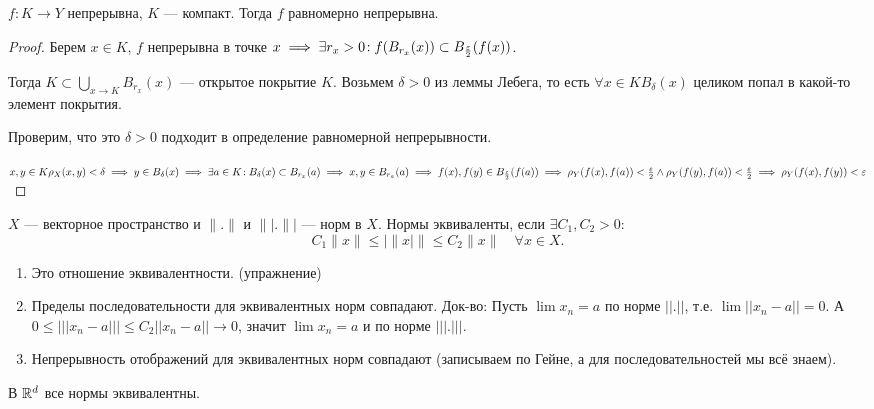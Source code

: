 \begin{theorem}
    $f\!: K \to Y$ непрерывна,  $K$ --- компакт. Тогда  $f$ равномерно непрерывна. 
\end{theorem}
\begin{proof}
    Берем $x \in K$,  $f$ непрерывна в точке  $x \implies \exists r_x > 0\!: f(B_{r_x}(x)) \subset B_{\frac{\varepsilon}{2}}(f(x))$. 

    Тогда $K \subset \bigcup\limits_{x \to K} B_{r_x}(x)$ --- открытое покрытие $K$. Возьмем  $\delta > 0$ из леммы Лебега, то есть  $\forall x \in K B_\delta(x)$ целиком попал в какой-то элемент покрытия. 

    Проверим, что это  $\delta > 0$ подходит в определение равномерной непрерывности.

     $x, y \in K \rho_X(x, y) < \delta \implies y \in B_\delta(x) \implies \exists a \in K\!: B_\delta(x) \subset B_{r_x}(a) \implies x, y \in B_{r_a}(a) \implies f(x), f(y) \in B_{\frac{\varepsilon}{2}}(f(a)) \implies \rho_Y(f(x), f(a)) < \frac{\varepsilon}{2} \land \rho_Y(f(y), f(a)) < \frac{\varepsilon}{2} \implies \rho_Y(f(x), f(y)) < \varepsilon$
\end{proof}
\begin{definition}
    $X$ --- векторное пространство и  $\| . \|$ и  $\|| . \||$ --- норм в  $X$. 
    Нормы эквиваленты, если $\exists C_1, C_2 > 0$\!: 
    \[
    C_1 \| x\| \le |\| x |\| \le C_2 \| x \| \quad \forall x \in X
    .\] 
\end{definition}
\begin{remark}
    \begin{enumerate}
        \item Это отношение эквивалентности. (упражнение)
        \item Пределы последовательности для эквивалентных норм совпадают. Док-во:
        Пусть $\lim x_n = a$ по норме $||.||$, т.е. $\lim ||x_n - a|| = 0$. А $0 \le |||x_n - a||| \le C_2 ||x_n - a|| \rightarrow 0$, значит $\lim x_n = a$ и по норме $|||.|||$.
        \item Непрерывность отображений для эквивалентных норм совпадают (записываем по Гейне, а для последовательностей мы всё знаем).
    \end{enumerate}
\end{remark}
\begin{theorem}
   В $\mathbb{R}^d$ все нормы эквивалентны. 
\end{theorem}

